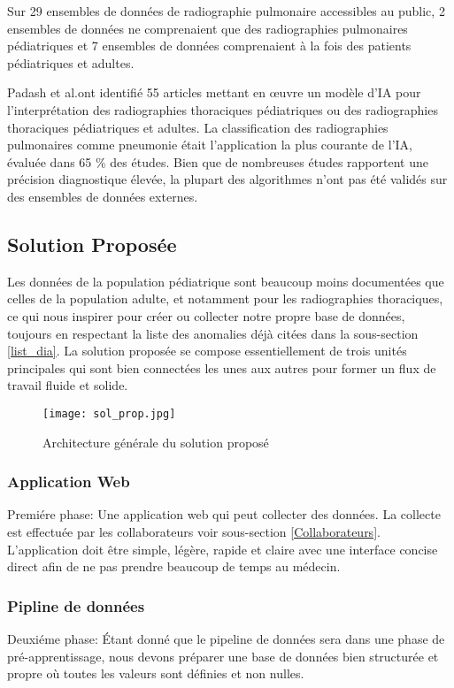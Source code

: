                 Sur 29 ensembles de données de radiographie pulmonaire accessibles au public, 2 ensembles de données ne comprenaient que des radiographies pulmonaires pédiatriques et 7 ensembles de données comprenaient à la fois des patients pédiatriques et adultes. 

                Padash et al.ont identifié 55 articles mettant en œuvre un modèle d'IA pour l'interprétation des radiographies thoraciques pédiatriques ou des radiographies thoraciques pédiatriques et adultes. La classification des radiographies pulmonaires comme pneumonie était l'application la plus courante de l'IA, évaluée dans 65 \% des études. Bien que de nombreuses études rapportent une précision diagnostique élevée, la plupart des algorithmes n'ont pas été validés sur des ensembles de données externes.

        \subsection{Solution Proposée}\label{Solution_prop}
            Les  données de la population pédiatrique sont beaucoup moins documentées que celles de la population adulte, et notamment pour les radiographies thoraciques, ce qui nous inspirer pour créer ou collecter notre propre base de données, toujours en respectant la liste des anomalies déjà citées dans la sous-section \ref{list_dia}.
            La solution proposée se compose essentiellement de trois unités principales qui sont bien connectées les unes aux autres pour former un flux de travail fluide et solide.
            \begin{figure}[H]
                \centering
                \texttt{[image: sol\_prop.jpg]}
                \caption{Architecture générale du solution proposé}\label{fig:sol_prop}
            \end{figure}
            \subsubsection*{Application Web}
                Premiére phase:
                Une application web qui peut collecter des données. La collecte est effectuée par les collaborateurs voir sous-section \ref{Collaborateurs}. L'application doit être simple, légère, rapide et claire avec une interface concise direct afin de ne pas prendre beaucoup de temps au médecin.
            \subsubsection*{Pipline de données}
                Deuxiéme phase:
                Étant donné que le pipeline de données sera dans une phase de pré-apprentissage, nous devons préparer une base de données bien structurée et propre où toutes les valeurs sont définies et non nulles.
